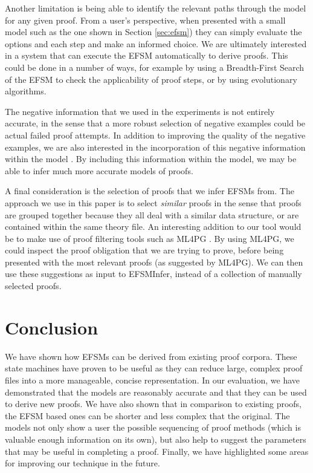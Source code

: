 \documentclass{llncs}
\begin{document}
Another limitation is being able to identify the relevant paths through the model for any given proof. From a user's perspective, when presented with a small model such as the one shown in Section \ref{sec:efsm}) they can simply evaluate the options and each step and make an informed choice. We are ultimately interested in a system that can execute the EFSM automatically to derive proofs. This could be done in a number of ways, for example by using a Breadth-First Search of the EFSM to check the applicability of proof steps, or by using evolutionary algorithms.

The negative information that we used in the experiments is not entirely accurate, in the sense that a more robust selection of negative examples could be actual failed proof attempts. In addition to improving the quality of the negative examples, we are also interested in the incorporation of this negative information within the model \cite{Walkinshaw09}. By including this information within the model, we may be able to infer much more accurate models of proofs.

A final consideration is the selection of proofs that we infer EFSMs from. The approach we use in this paper is to select \emph{similar} proofs in the sense that proofs are grouped together because they all deal with a similar data structure, or are contained within the same theory file. An interesting addition to our tool would be to make use of proof filtering tools such as ML4PG \cite{ML4PG13}. By using ML4PG, we could inspect the proof obligation that we are trying to prove, before being presented with the most relevant proofs (as suggested by ML4PG). We can then use these suggestions as input to EFSMInfer, instead of a collection of manually selected proofs.

\section{Conclusion}
\label{sec:conclusion}
We have shown how EFSMs can be derived from existing proof corpora. These state machines have proven to be useful as they can reduce large, complex proof files into a more manageable, concise representation. In our evaluation, we have demonstrated that the models are reasonably accurate and that they can be used to derive new proofs. We have also shown that in comparison to existing proofs, the EFSM based ones can be shorter and less complex that the original. The models not only show a user the possible sequencing of proof methods (which is valuable enough information on its own), but also help to suggest the parameters that may be useful in completing a proof. Finally, we have highlighted some areas for improving our technique in the future.


\end{document}

